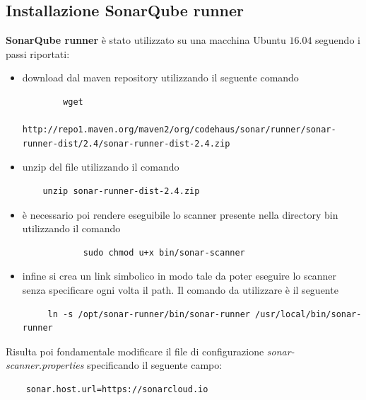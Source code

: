 \subsection{Installazione SonarQube runner}
\textbf{SonarQube runner} è stato utilizzato su una macchina Ubuntu $16.04$ seguendo i passi riportati:
\begin{itemize}
	\item download dal maven repository utilizzando il seguente comando 
	\begin{verbatim}
		wget 
		http://repo1.maven.org/maven2/org/codehaus/sonar/runner/sonar-runner-dist/2.4/sonar-runner-dist-2.4.zip
	\end{verbatim}	
	\item unzip del file utilizzando il comando
	\begin{verbatim}
	unzip sonar-runner-dist-2.4.zip
	\end{verbatim}
	\item è necessario poi rendere eseguibile lo scanner presente nella directory bin utilizzando il comando 
	\begin{verbatim}
			sudo chmod u+x bin/sonar-scanner
	\end{verbatim}
	\item infine si crea un link simbolico in modo tale da poter eseguire lo scanner senza specificare ogni volta il path. Il comando da utilizzare è il seguente
	\begin{verbatim}
	 ln -s /opt/sonar-runner/bin/sonar-runner /usr/local/bin/sonar-runner
	\end{verbatim}
\end{itemize}
Risulta poi fondamentale modificare il file di configurazione \textit{sonar-scanner.properties} specificando il seguente campo:
\begin{verbatim}
	sonar.host.url=https://sonarcloud.io
\end{verbatim}


